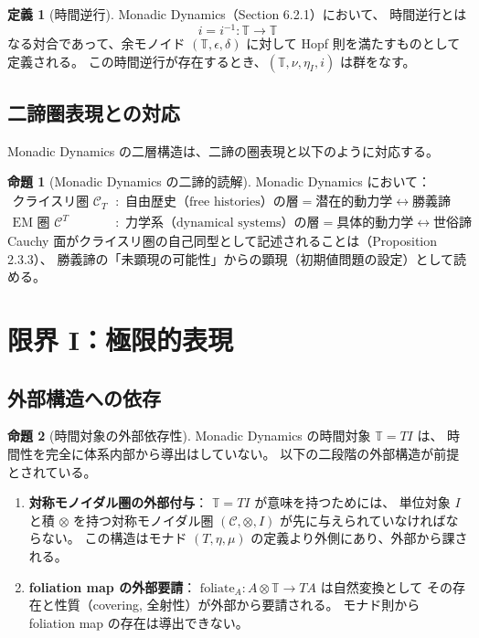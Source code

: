 \documentclass[11pt,a4paper]{ltjsarticle}
\theoremstyle{definition}
\newtheorem{definition}{定義}[section]
\newtheorem{proposition}{命題}[section]
\begin{document}
\begin{definition}[時間逆行]
Monadic Dynamics（Section 6.2.1）において、
時間逆行とは
\[
i = i^{-1} : \mathbb{T} \to \mathbb{T}
\]
なる対合であって、余モノイド $(\mathbb{T}, \epsilon, \delta)$ に対して
Hopf 則を満たすものとして定義される。
この時間逆行が存在するとき、$(\mathbb{T}, \nu, \eta_I, i)$ は群をなす。
\end{definition}

\subsection{二諦圏表現との対応}

Monadic Dynamics の二層構造は、二諦の圏表現と以下のように対応する。

\begin{proposition}[Monadic Dynamics の二諦的読解]
Monadic Dynamics において：
\begin{align}
\text{クライスリ圏 } \mathcal{C}_T &: \text{ 自由歴史（free histories）の層}
  = \text{潜在的動力学} \leftrightarrow \text{勝義諦} \\
\text{EM 圏 } \mathcal{C}^T &: \text{ 力学系（dynamical systems）の層}
  = \text{具体的動力学} \leftrightarrow \text{世俗諦}
\end{align}
Cauchy 面がクライスリ圏の自己同型として記述されることは（Proposition 2.3.3）、
勝義諦の「未顕現の可能性」からの顕現（初期値問題の設定）として読める。
\end{proposition}

\section{限界 I：極限的表現}

\subsection{外部構造への依存}

\begin{proposition}[時間対象の外部依存性]
Monadic Dynamics の時間対象 $\mathbb{T} = TI$ は、
時間性を完全に体系内部から導出はしていない。
以下の二段階の外部構造が前提とされている。

\begin{enumerate}
\item \textbf{対称モノイダル圏の外部付与}：
  $\mathbb{T} = TI$ が意味を持つためには、
  単位対象 $I$ と積 $\otimes$ を持つ対称モノイダル圏 $(\mathcal{C}, \otimes, I)$
  が先に与えられていなければならない。
  この構造はモナド $(T, \eta, \mu)$ の定義より外側にあり、外部から課される。

\item \textbf{foliation map の外部要請}：
  $\mathrm{foliate}_A: A \otimes \mathbb{T} \to TA$ は自然変換として
  その存在と性質（covering, 全射性）が外部から要請される。
  モナド則から foliation map の存在は導出できない。
\end{enumerate}
\end{proposition}
\end{document}
